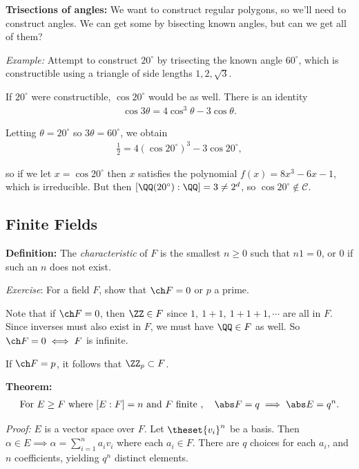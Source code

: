 \textbf{Trisections of angles:} We want to construct regular polygons,
so we'll need to construct angles. We can get some by bisecting known
angles, but can we get all of them?

\emph{Example:} Attempt to construct \(20^\circ\) by trisecting the
known angle \(60^\circ\), which is constructible using a triangle of
side lengths \(1,2,\sqrt 3\).

If \(20^\circ\) were constructible, \(\cos 20^\circ\) would be as well.
There is an identity
\begin{align*}
\cos 3\theta = 4\cos^3 \theta - 3\cos \theta
.\end{align*}

Letting \(\theta = 20^\circ\) so \(3\theta = 60^\circ\), we obtain
\begin{align*}
\frac 1 2 = 4(\cos 20^\circ)^3 - 3\cos 20^\circ,
\end{align*}

so if we let \(x = \cos 20^\circ\) then \(x\) satisfies the polynomial
\(f(x) = 8x^3 - 6x - 1\), which is irreducible. But then
\([\QQ(20^\circ):\QQ] = 3 \neq 2^d\), so
\(\cos 20^\circ \not\in\mathcal C\).

\hypertarget{finite-fields}{%
\subsection{Finite Fields}\label{finite-fields}}

\textbf{Definition:} The \emph{characteristic} of \(F\) is the smallest
\(n\geq 0\) such that \(n1 = 0\), or \(0\) if such an \(n\) does not
exist.

\emph{Exercise}: For a field \(F\), show that \(\ch F = 0\) or \(p\) a
prime.

Note that if \(\ch F = 0\), then \(\ZZ \in F\) since
\(1,~ 1+1,~ 1+1+1, \cdots\) are all in \(F\). Since inverses must also
exist in \(F\), we must have \(\QQ \in F\) as well. So
\(\ch F = 0 \iff F\) is infinite.

If \(\ch F = p\), it follows that \(\ZZ_p \subset F\).

\textbf{Theorem:}
\begin{align*}
\text{For } E \geq F \text{ where } [E: F] = n \text{ and } F \text{ finite }, \quad
\abs F = q \implies \abs E = q^n
.\end{align*}

\emph{Proof:} \(E\) is a vector space over \(F\). Let \(\theset{v_i}^n\)
be a basis. Then \(\alpha \in E \implies \alpha = \sum_{i=1}^n a_i v_i\)
where each \(a_i \in F\). There are \(q\) choices for each \(a_i\), and
\(n\) coefficients, yielding \(q^n\) distinct elements.

